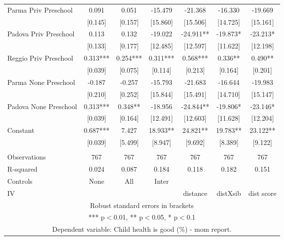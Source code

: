 \begin{tabular}{lcccccc}
Parma Priv Preschool & 0.091 & 0.051 & -15.479 & -21.368 & -16.330 & -19.669 \\
 & [0.145] & [0.157] & [15.860] & [15.506] & [14.725] & [15.161] \\
Padova Priv Preschool & 0.113 & 0.132 & -19.022 & -24.911** & -19.873* & -23.213* \\
 & [0.133] & [0.177] & [12.485] & [12.597] & [11.622] & [12.198] \\
Reggio Priv Preschool & 0.313*** & 0.254*** & 0.311*** & 0.568*** & 0.336** & 0.490** \\
 & [0.039] & [0.075] & [0.114] & [0.213] & [0.164] & [0.201] \\
Parma None Preschool & -0.187 & -0.257 & -15.793 & -21.683 & -16.644 & -19.983 \\
 & [0.210] & [0.252] & [15.844] & [15.491] & [14.710] & [15.147] \\
Padova None Preschool & 0.313*** & 0.348** & -18.956 & -24.844** & -19.806* & -23.146* \\
 & [0.039] & [0.164] & [12.491] & [12.603] & [11.628] & [12.204] \\
Constant & 0.687*** & 7.427 & 18.933** & 24.821** & 19.783** & 23.122** \\
 & [0.039] & [5.499] & [8.947] & [9.692] & [8.389] & [9.122] \\
 &  &  &  &  &  &  \\
Observations & 767 & 767 & 767 & 767 & 767 & 767 \\
R-squared & 0.024 & 0.087 & 0.184 & 0.118 & 0.182 & 0.151 \\
Controls & None & All & Inter &  &  &  \\
 IV &  &  &  & distance & distXsib & dist score \\ \hline
\multicolumn{7}{c}{ Robust standard errors in brackets} \\
\multicolumn{7}{c}{ *** p$<$0.01, ** p$<$0.05, * p$<$0.1} \\
\multicolumn{7}{c}{ Dependent variable: Child health is good (\%) - mom report.} \\
\end{tabular}
